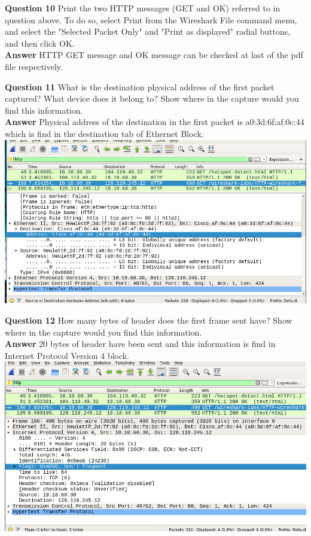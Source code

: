 \documentclass[14pt]{extarticle}
\begin{document}
    \noindent
    \textbf{\large Question 10}
    Print the two HTTP messages (GET and OK) referred to in question above. To do so, select
Print from the Wireshark File command menu, and select the "Selected Packet Only" and
"Print as displayed" radial buttons, and then click OK.\\[10pt]
    \textbf{\large Answer}
    HTTP GET message and OK message can be checked at last of the pdf file respectively.
    \vspace{1cm}

    \noindent
    \textbf{\large Question 11}
    What is the destination physical address of the first packet captured? What device does it
belong to? Show where in the capture would you find this information.\\[10pt]
    \textbf{\large Answer}
    Physical address of the destination in the first packet is 
    a0:3d:6f:af:0c:44 which is find in the destination tab of \textmd{Ethernet Block}.\\[10pt]
    \includegraphics[scale=0.5]{11}
    \vspace{1cm}
    
    \noindent
    \textbf{\large Question 12}
    How many bytes of header does the first frame sent have? Show where in the capture would
you find this information.\\[10pt]
    \textbf{\large Answer}
    20 bytes of header have been sent and this information is find in Internet Protocol Version 4 block.\\[10pt]
    \includegraphics[scale=0.45]{12}
    \vspace{1cm}
    
\end{document}

